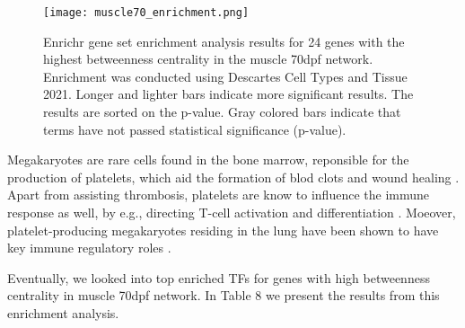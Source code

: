 \documentclass[
	a4paper, %
	10pt, %
	unnumberedsections, %
	twoside, %
]{LTJournalArticle}
\begin{document}
\begin{figure}[H] %
	\texttt{[image: muscle70\_enrichment.png]}
	\caption{Enrichr gene set enrichment analysis results for 24 genes
	with the highest betweenness centrality in the muscle 70dpf network. Enrichment 
	was conducted using Descartes Cell Types and Tissue 2021. Longer and lighter
	bars indicate more significant results. The results are sorted on
	the p-value. Gray colored bars indicate that terms have 
	not passed statistical significance (p-value).}
	\label{fig:muscle70enr}
\end{figure}

\noindent Megakaryotes are rare cells found in the bone marrow, reponsible for the
production of platelets, which aid the formation of blod clots
and wound healing \autocite{davenport2022a}. Apart from assisting thrombosis,
platelets are know to influence the immune response as well, by e.g., directing T-cell
activation and differentiation \autocite{ali2015a, koupenova2022a}.
Moeover, platelet-producing megakaryotes residing in the lung have
been shown to have key immune regulatory roles \autocite{pariser2021a}.

\noindent Eventually, we looked into top enriched TFs for genes with
high betweenness centrality in muscle 70dpf network. In Table 8 we present
the results from this enrichment analysis.

\begin{table}[H]
	\caption{Transcription Factor Target Over-representation Analysis results for 24 genes with the highest betweenness centrality in the muscle 70dpf network from the ChEA3 web tool.}
	\label{tab:muscle70_tf}
	\end{table}
\end{document}
